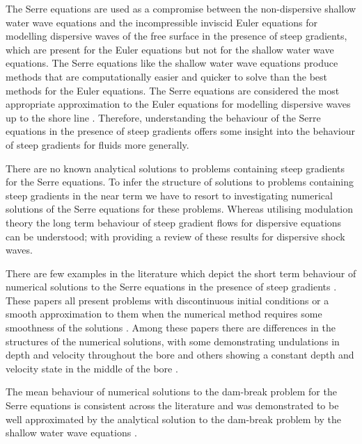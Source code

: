 \documentclass[times]{elsarticle}
\begin{document}
The Serre equations are used as a compromise between the non-dispersive shallow water wave equations and the incompressible inviscid Euler equations for modelling dispersive waves of the free surface in the presence of steep gradients, which are present for the Euler equations \cite{Mitsotakis-etal-2017} but not for the shallow water wave equations. The Serre equations like the shallow water wave equations produce methods \cite{Hank-etal-2010-2034,Zoppou-etal-2016,Zoppou-etal-2017} that are computationally easier and quicker to solve than the best methods for the Euler equations. The Serre equations are considered the most appropriate approximation to the Euler equations for modelling dispersive waves up to the shore line \cite{Bonneton-etal-2011-589,Bonneton-etal-2011-1479}. Therefore, understanding the behaviour of the Serre equations in the presence of steep gradients offers some insight into the behaviour of steep gradients for fluids more generally.

There are no known analytical solutions to problems containing steep gradients for the Serre equations. To infer the structure of solutions to problems containing steep gradients in the near term we have to resort to investigating numerical solutions of the Serre equations for these problems. Whereas utilising modulation theory the long term behaviour of steep gradient flows for dispersive equations can be understood; with \citet{El-Hoefer-2016-11} providing a review of these results for dispersive shock waves.

There are few examples in the literature which depict the short term behaviour of numerical solutions to the Serre equations in the presence of steep gradients \cite{El-etal-2006,Hank-etal-2010-2034,Mitsotakis-etal-2014,Mitsotakis-etal-2017,Zoppou-etal-2016,Zoppou-etal-2017}. These papers all present problems with discontinuous initial conditions \cite{Hank-etal-2010-2034,Zoppou-etal-2016,Zoppou-etal-2017} or a smooth approximation to them when the numerical method requires some smoothness of the solutions \cite{El-etal-2006,Mitsotakis-etal-2014,Mitsotakis-etal-2017}. Among these papers there are differences in the structures of the numerical solutions, with some demonstrating undulations in depth and velocity throughout the bore \cite{El-etal-2006,Zoppou-etal-2016,Zoppou-etal-2017} and others showing a constant depth and velocity state in the middle of the bore \cite{Hank-etal-2010-2034,Mitsotakis-etal-2014,Mitsotakis-etal-2017}.

The mean behaviour of numerical solutions to the dam-break problem for the Serre equations is consistent across the literature \cite{El-etal-2006,Zoppou-etal-2016,Zoppou-etal-2017,Hank-etal-2010-2034,Mitsotakis-etal-2014,Mitsotakis-etal-2017} and was demonstrated to be well approximated by the analytical solution to the dam-break problem by the shallow water wave equations \cite{Hank-etal-2010-2034,Mitsotakis-etal-2014}. 
\end{document}
